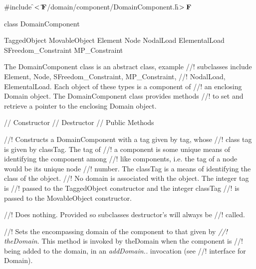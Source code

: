 
\indent \#include \f$<\tilde{ }{\bf F}$/domain/component/DomainComponent.h\f$>{\bf F}$

\indent class DomainComponent

\indent  TaggedObject
\indent  MovableObject
\indent{}
\indent\indent\indent  Element
\indent\indent\indent  Node
\indent\indent\indent  NodalLoad
\indent\indent\indent  ElementalLoad
\indent\indent\indent  SFreedom\_Constraint
\indent\indent\indent  MP\_Constraint

\indent The DomainComponent class is an abstract class, example
//! subclasses include Element, Node, SFreedom\_Constraint, MP\_Constraint,
//! NodalLoad, ElementalLoad. Each object of these types is a component of
//! an enclosing Domain object. The DomainComponent class provides methods
//! to set and retrieve a pointer to the enclosing Domain object.

\indent\indent // Constructor
\indent{}
\indent\indent // Destructor
\indent{}
\indent\indent // Public Methods
\indent{}
\indent{}
\indent{}

//! Constructs a DomainComponent with a tag given by \p tag, whose
//! class tag is given by \p classTag. The tag of
//! a component is some unique means of identifying the component among
//! like components, i.e. the tag of a node would be its unique node
//! number. The \p classTag is a means of identifying the class of the object.
//! No domain is associated with the object. The integer \p tag is
//! passed to the TaggedObject constructor and the integer \p classTag
//! is passed to the MovableObject constructor.

//! Does nothing. Provided so subclasses destructor's will always be
//! called.

//! Sets the encompassing domain of the component to that given by {\em
//! theDomain}. This method is invoked by \p theDomain when the component is
//! being added to the domain, in an {\em addDomain..} invocation (see
//! interface for Domain).

